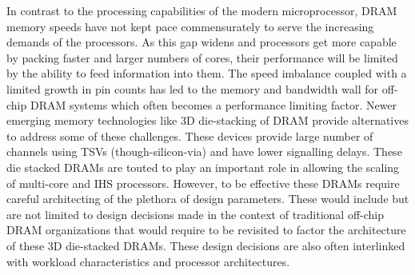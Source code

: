\par In contrast to the processing capabilities of the modern microprocessor, DRAM memory speeds have not kept pace commensurately to serve the increasing demands of the processors. As this gap widens and processors get more capable by packing faster and larger numbers of cores, their performance will be limited by the ability to feed information into them. The speed imbalance coupled with a limited growth in pin counts has led to the memory and bandwidth wall \cite{memory-wall,bandwidth-wall} for off-chip DRAM systems which often becomes a performance limiting factor.
Newer emerging memory technologies like 3D die-stacking of DRAM provide alternatives to address some of these challenges. These devices provide large number of channels using TSVs (though-silicon-via) and have lower signalling delays. These die stacked DRAMs are touted to play an important role in allowing the scaling of multi-core and IHS processors.
However, to be effective these DRAMs require careful architecting of the plethora of design parameters. These would include but are not limited to design decisions made in the context of traditional off-chip DRAM organizations that would require to be revisited to factor the architecture of these 3D die-stacked DRAMs. These design decisions are also often interlinked with workload characteristics and processor architectures.

